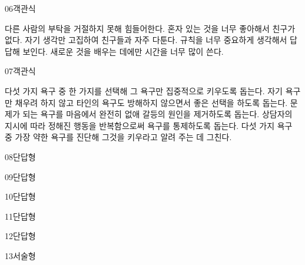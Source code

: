 \documentclass[fs85,seriesRus]{korfarm-base}
\begin{document}
\begin{kfQBlock}{06}{객관식}
\begin{kfChoices}
\kfChoice 다른 사람의 부탁을 거절하지 못해 힘들어한다.
\kfChoice 혼자 있는 것을 너무 좋아해서 친구가 없다.
\kfChoice 자기 생각만 고집하여 친구들과 자주 다툰다.
\kfChoice 규칙을 너무 중요하게 생각해서 답답해 보인다.
\kfChoice 새로운 것을 배우는 데에만 시간을 너무 많이 쓴다.
\end{kfChoices}
\end{kfQBlock}
\begin{kfQBlock}{07}{객관식}
\begin{kfChoices}
\kfChoice 다섯 가지 욕구 중 한 가지를 선택해 그 욕구만 집중적으로 키우도록 돕는다.
\kfChoice 자기 욕구만 채우려 하지 않고 타인의 욕구도 방해하지 않으면서 좋은 선택을 하도록 돕는다.
\kfChoice 문제가 되는 욕구를 마음에서 완전히 없애 갈등의 원인을 제거하도록 돕는다.
\kfChoice 상담자의 지시에 따라 정해진 행동을 반복함으로써 욕구를 통제하도록 돕는다.
\kfChoice 다섯 가지 욕구 중 가장 약한 욕구를 진단해 그것을 키우라고 알려 주는 데 그친다.
\end{kfChoices}
\end{kfQBlock}
\begin{kfQBlock}{08}{단답형}
\end{kfQBlock}
\begin{kfQBlock}{09}{단답형}
\end{kfQBlock}
\begin{kfQBlock}{10}{단답형}
\end{kfQBlock}
\begin{kfQBlock}{11}{단답형}
\end{kfQBlock}
\begin{kfQBlock}{12}{단답형}
\end{kfQBlock}
\begin{kfQBlock}{13}{서술형}
\end{kfQBlock}
\kfEndMC
\end{document}
